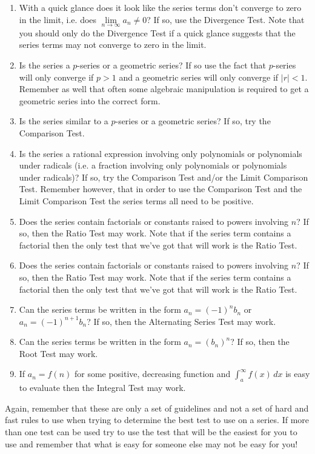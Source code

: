 \documentclass[10pt,reqno]{book}
\theoremstyle{definition}
\begin{document}
	\begin{enumerate}
		\item With a quick glance does it look like the series terms don't converge to zero in the limit, i.e. does $ \lim\limits_{n \to \infty} a_n \neq 0 $? If so, use the Divergence Test. Note that you should only do the Divergence Test if a quick glance suggests that the series terms may not converge to zero in the limit.
		
		\item Is the series a $ p $-series or a geometric series? If so use the fact that $ p $-series will only converge if $ p > 1 $ and a geometric series will only converge if $ |r| < 1 $. Remember as well that often some algebraic manipulation is required to get a geometric series into the correct form.
		
		\item Is the series similar to a $ p $-series or a geometric series? If so, try the Comparison Test.
		
		\item Is the series a rational expression involving only polynomials or polynomials under radicals (i.e. a fraction involving only polynomials or polynomials under radicals)? If so, try the Comparison Test and/or the Limit Comparison Test. Remember however, that in order to use the Comparison Test and the Limit Comparison Test the series terms all need to be positive.
		
		\item Does the series contain factorials or constants raised to powers involving $ n $? If so, then the Ratio Test may work. Note that if the series term contains a factorial then the only test that we've got that will work is the Ratio Test.
		
		\item Does the series contain factorials or constants raised to powers involving $ n $? If so, then the Ratio Test may work. Note that if the series term contains a factorial then the only test that we've got that will work is the Ratio Test. 
		 
		\item Can the series terms be written in the form $ a_n = (-1)^n b_n $ or $ a_n = (-1)^{n+1} b_n $? If so, then the Alternating Series Test may work.
		
		\item Can the series terms be written in the form $ a_n = (b_n)^n $? If so, then the Root Test may work.
		
		\item If $ a_n = f(n) $ for some positive, decreasing function and $ \int_{a}^{\infty} f(x)\,dx $ is easy to evaluate then the Integral Test may work.
	\end{enumerate}
	Again, remember that these are only a set of guidelines and not a set of hard and fast rules to use when trying to determine the best test to use on a series. If more than one test can be used try to use the test that will be the easiest for you to use and remember that what is easy for someone else may not be easy for you!
	
\end{document}
